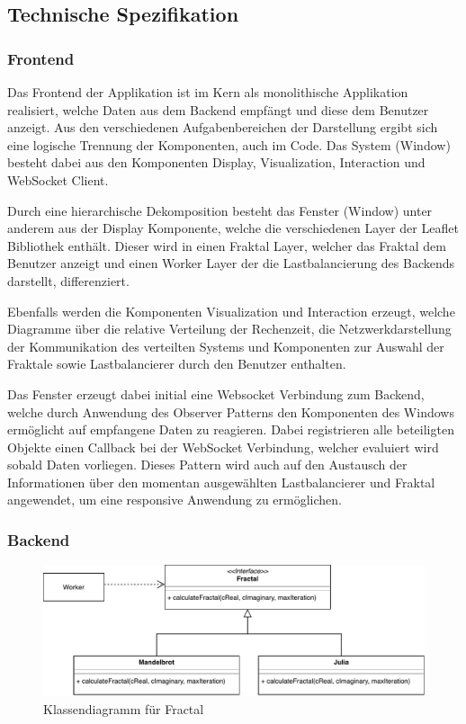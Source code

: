 
\subsection{Technische Spezifikation}

\subsubsection{Frontend}
Das Frontend der Applikation ist im Kern als monolithische Applikation realisiert, welche Daten aus dem Backend empfängt und diese dem Benutzer anzeigt. Aus den verschiedenen Aufgabenbereichen der Darstellung ergibt sich eine logische Trennung  der Komponenten, auch im Code. Das System (Window) besteht dabei aus den Komponenten Display, Visualization, Interaction und WebSocket Client.

Durch eine hierarchische Dekomposition besteht das Fenster (Window) unter anderem aus der Display Komponente, welche die verschiedenen Layer der Leaflet Bibliothek enthält. Dieser wird in einen Fraktal Layer, welcher das Fraktal dem Benutzer anzeigt und einen Worker Layer der die Lastbalancierung des Backends darstellt, differenziert. 

Ebenfalls werden die Komponenten Visualization und Interaction erzeugt, welche Diagramme über die relative Verteilung der Rechenzeit, die Netzwerkdarstellung der Kommunikation des verteilten Systems und Komponenten zur Auswahl der Fraktale sowie Lastbalancierer durch den Benutzer enthalten. 

Das Fenster erzeugt dabei initial eine Websocket Verbindung zum Backend, welche durch Anwendung des Observer Patterns den Komponenten des Windows ermöglicht auf empfangene Daten zu reagieren. Dabei registrieren alle beteiligten Objekte einen Callback bei der WebSocket Verbindung, welcher evaluiert wird sobald Daten vorliegen. Dieses Pattern wird auch auf den Austausch der Informationen über den momentan ausgewählten Lastbalancierer und Fraktal angewendet, um eine responsive Anwendung zu ermöglichen.

\subsubsection{Backend}

\begin{figure}
    \centering
        \includegraphics[width=0.8\linewidth]{img/Implementierung/Fractals.pdf}
        \caption{Klassendiagramm für Fractal}
    \label{fig:klassendiagramm_fractal}
\end{figure}

